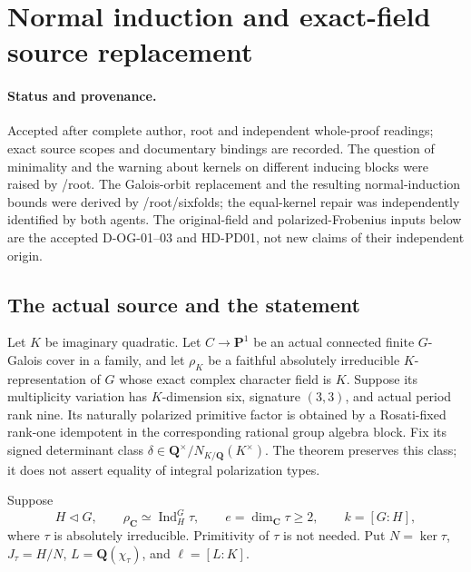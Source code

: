 \section{Normal induction and exact-field source replacement}
\label{sec:SF-normal-induction-descent}

\paragraph{Status and provenance.}
Accepted after complete author, root and independent whole-proof
readings; exact source scopes and documentary bindings are recorded.
The question of minimality and the warning about kernels on different
inducing blocks were raised by /root.  The Galois-orbit replacement and
the resulting normal-induction bounds were derived by /root/sixfolds;
the equal-kernel repair was independently identified by both agents.
The original-field and polarized-Frobenius inputs below are the accepted
D-OG-01--03 and HD-PD01, not new claims of their independent origin.

\subsection*{The actual source and the statement}

Let $K$ be imaginary quadratic.  Let $C\to\mathbf P^1$ be an actual
connected finite $G$-Galois cover in a family, and let $\rho_K$ be a
faithful absolutely irreducible $K$-representation of $G$ whose exact
complex character field is $K$.  Suppose its multiplicity variation has
$K$-dimension six, signature $(3,3)$, and actual period rank nine.
Its naturally polarized primitive factor is obtained by a
Rosati-fixed rank-one idempotent in the corresponding rational group
algebra block.  Fix its signed determinant class
$\delta\in\mathbf Q^\times/N_{K/\mathbf Q}(K^\times)$.
The theorem preserves this class; it does not assert equality of
integral polarization types.

Suppose
\[
 H\triangleleft G,\qquad
 \rho_{\mathbf C}\simeq\operatorname{Ind}_H^G\tau,
 \qquad e=\dim_{\mathbf C}\tau\ge2,
 \qquad k=[G:H],
 \tag{NID.1}
\]
where $\tau$ is absolutely irreducible.  Primitivity of $\tau$ is not
needed.  Put $N=\ker\tau$, $J_\tau=H/N$, $L=\mathbf Q(\chi_\tau)$,
and $\ell=[L:K]$.

